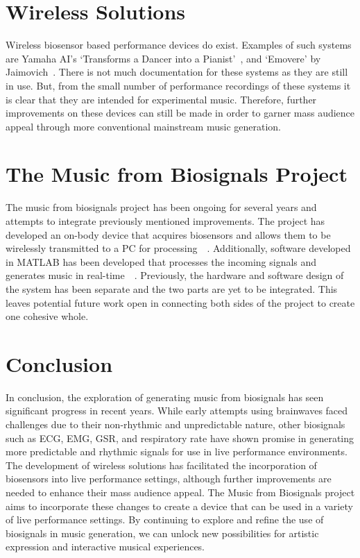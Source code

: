 \section{Wireless Solutions}
Wireless biosensor based performance devices do exist.
Examples of such systems are Yamaha AI's `Transforms a Dancer into a Pianist'~\cite{Yamaha:2018}, and `Emovere' by Jaimovich~\cite{Jaimovich:2016}.
There is not much documentation for these systems as they are still in use.
But, from the small number of performance recordings of these systems it is clear that they are intended for experimental music.
Therefore, further improvements on these devices can still be made in order to garner mass audience appeal through more conventional mainstream music generation.

\section{The Music from Biosignals Project}
The music from biosignals project has been ongoing for several years and attempts to integrate previously mentioned improvements.
The project has developed an on-body device that acquires biosensors and allows them to be wirelessly transmitted to a PC for processing~\cite{Pierro:2019}~\cite{Tran:2022}.
Additionally, software developed in MATLAB has been developed that processes the incoming signals and generates music in real-time~\cite{Chen:2016}~\cite{Nicholls:2019}.
Previously, the hardware and software design of the system has been separate and the two parts are yet to be integrated.
This leaves potential future work open in connecting both sides of the project to create one cohesive whole.

\section{Conclusion}
In conclusion, the exploration of generating music from biosignals has seen significant progress in recent years.
While early attempts using brainwaves faced challenges due to their non-rhythmic and unpredictable nature,
other biosignals such as ECG, EMG, GSR, and respiratory rate have shown promise in generating more predictable and rhythmic signals for use in live performance environments.
The development of wireless solutions has facilitated the incorporation of biosensors into live performance settings,
although further improvements are needed to enhance their mass audience appeal.
The Music from Biosignals project aims to incorporate these changes to create a device that can be used in a variety of live performance settings.
By continuing to explore and refine the use of biosignals in music generation, we can unlock new possibilities for artistic expression and interactive musical experiences.
